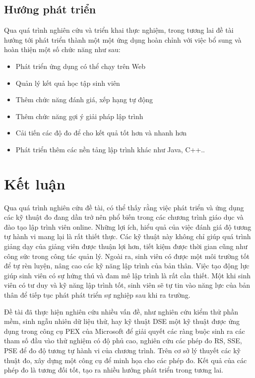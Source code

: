 \subsection{Hướng phát triển}

Qua quá trình nghiên cứu và triển khai thực nghiệm, trong tương lai đề
tài hướng tới phát triển thành một một ứng dụng hoàn chỉnh với việc bổ
sung và hoàn thiện một số chức năng như sau:
\begin{itemize}
\item Phát triển ứng dụng có thể chạy trên Web
\item Quản lý kết quả học tập sinh viên
\item Thêm chức năng đánh giá, xếp hạng tự động
\item Thêm chức năng gợi ý giải pháp lập trình
\item Cải tiến các độ đo để cho kết quả tốt hơn và nhanh hơn
\item Phát triển thêm các nền tảng lập trình khác như Java, C++..
\end{itemize}

\section{Kết luận}

Qua quá trình nghiên cứu đề tài, có thể thấy rằng việc phát triển và
ứng dụng các kỹ thuật đo đang dần trở nên phổ biến trong các chương
trình giáo dục và đào tạo lập trình viên online. Những lợi ích, hiểu
quả của việc đánh giá độ tương tự hành vi mang lại là rất thiết
thực. Các kỹ thuật này không chỉ giúp quá trình giảng dạy của giảng
viên được thuận lợi hơn, tiết kiệm được thời gian cũng như công sức
trong công tác quản lý. Ngoài ra, sinh viên có được một môi trường tốt
để tự rèn luyện, nâng cao các kỹ năng lập trình của bản thân. Việc tạo
động lực giúp sinh viên có sự hứng thú và đam mê lập trình là rất cần
thiết. Một khi sinh viên có tư duy và kỹ năng lập trình tốt, sinh viên
sẽ tự tin vào năng lực của bản thân để tiếp tục phát phát triển sự
nghiệp sau khi ra trường.

Đề tài đã thực hiện nghiên cứu nhiều vấn đề, như nghiên cứu kiểm thử
phần mềm, sinh ngẫu nhiên dữ liệu thử, hay kỹ thuật DSE một kỹ thuật
được ứng dụng trong công cụ PEX của Microsoft để giải quyết các ràng
buộc sinh ra các tham số đầu vào thử nghiệm có độ phủ cao, nghiên cứu
các phép đo RS, SSE, PSE để đo độ tương tự hành vi của chương
trình. Trên cơ sở lý thuyết các kỹ thuật đo, xây dựng một công cụ để
minh họa cho các phép đo. Kết quả của các phép đo là tương đối tốt,
tạo ra nhiều hướng phát triển trong tương lai.

